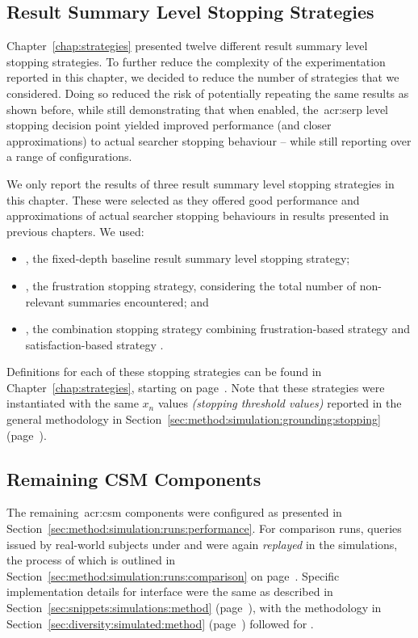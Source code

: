 \subsection{Result Summary Level Stopping Strategies}\label{sec:serp:method:snippet}
Chapter~\ref{chap:strategies} presented twelve different result summary level stopping strategies. To further reduce the complexity of the experimentation reported in this chapter, we decided to reduce the number of strategies that we considered. Doing so reduced the risk of potentially repeating the same results as shown before, while still demonstrating that when enabled, the~\gls{acr:serp} level stopping decision point yielded improved performance (and closer approximations) to actual searcher stopping behaviour -- while still reporting over a range of configurations.

We only report the results of three result summary level stopping strategies in this chapter. These were selected as they offered good performance and approximations of actual searcher stopping behaviours in results presented in previous chapters. We used:

\begin{itemize}
    \item{, the fixed-depth baseline result summary level stopping strategy;}
    \item{, the frustration stopping strategy, considering the total number of non-relevant summaries encountered; and}
    \item{, the combination stopping strategy combining frustration-based strategy  and satisfaction-based strategy .}
\end{itemize}

Definitions for each of these stopping strategies can be found in Chapter~\ref{chap:strategies}, starting on page~\pageref{chap:strategies}. Note that these strategies were instantiated with the same $x_n$ values \emph{(stopping threshold values)} reported in the general methodology in Section~\ref{sec:method:simulation:grounding:stopping} (page~\pageref{sec:method:simulation:grounding:stopping}).

\subsection{Remaining CSM Components}\label{sec:serp:method:other}
The remaining~\gls{acr:csm} components were configured as presented in Section~\ref{sec:method:simulation:runs:performance}. For comparison runs, queries issued by real-world subjects under  and  were again \emph{replayed} in the simulations, the process of which is outlined in Section~\ref{sec:method:simulation:runs:comparison} on page~\pageref{sec:method:simulation:runs:comparison}. Specific implementation details for interface  were the same as described in Section~\ref{sec:snippets:simulations:method} (page~\pageref{sec:snippets:simulations:method}), with the methodology in Section~\ref{sec:diversity:simulated:method} (page~\pageref{sec:diversity:simulated:method}) followed for .

